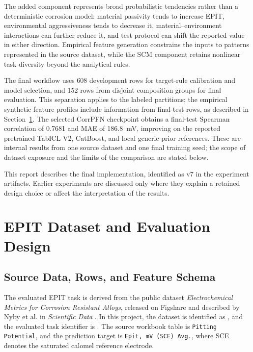 \documentclass{article}
\begin{document}
The added component represents broad probabilistic tendencies rather than a
deterministic corrosion model: material passivity tends to increase EPIT,
environmental aggressiveness tends to decrease it, material--environment
interactions can further reduce it, and test protocol can shift the reported
value in either direction. Empirical feature generation constrains the inputs
to patterns represented in the source dataset, while the SCM component
retains nonlinear task diversity beyond the analytical rules.

The final workflow uses 608 development rows for target-rule calibration and
model selection, and 152 rows from disjoint composition groups for final
evaluation. This separation applies to the labeled partitions; the empirical
synthetic feature profiles include information from final-test rows, as
described in Section~\ref{sec:epit-dataset}. The selected CorrPFN checkpoint
obtains a final-test Spearman correlation of 0.7681 and MAE of 186.8~mV,
improving on the reported
pretrained TabICL V2, CatBoost, and local generic-prior references. These are
internal results from one source dataset and one final training seed; the
scope of dataset exposure and the limits of the comparison are stated below.

This report describes the final implementation, identified as v7 in the
experiment artifacts. Earlier experiments are discussed only where they
explain a retained design choice or affect the interpretation of the results.

\section{EPIT Dataset and Evaluation Design}
\label{sec:epit-dataset}

\subsection{Source Data, Rows, and Feature Schema}

The evaluated EPIT task is derived from the public dataset
\textit{Electrochemical Metrics for Corrosion Resistant Alloys}, released on
Figshare and described by Nyby et al. in \textit{Scientific Data}
\cite{nyby2021electrochemical}. In this project, the dataset is identified as
, and the evaluated task identifier is
.
The source workbook table is \texttt{Pitting Potential}, and the prediction
target is \texttt{Epit, mV (SCE) Avg.}, where SCE denotes the saturated calomel
reference electrode.
\end{document}
